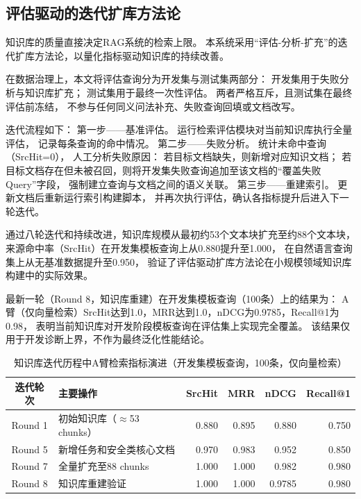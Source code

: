 \subsection{评估驱动的迭代扩库方法论}

知识库的质量直接决定RAG系统的检索上限。
本系统采用“评估-分析-扩充”的迭代扩库方法论，以量化指标驱动知识库的持续改善。

在数据治理上，本文将评估查询分为开发集与测试集两部分：
开发集用于失败分析与知识库扩充；
测试集用于最终一次性评估。
两者严格互斥，且测试集在最终评估前冻结，
不参与任何同义问法补充、失败查询回填或文档改写。

迭代流程如下：
第一步——基准评估。
运行检索评估模块对当前知识库执行全量评估，
记录每条查询的命中情况。
第二步——失败分析。
统计未命中查询（SrcHit=0），
人工分析失败原因：
若目标文档缺失，则新增对应知识文档；
若目标文档存在但未被召回，则将开发集失败查询追加至该文档的“覆盖失败Query”字段，
强制建立查询与文档之间的语义关联。
第三步——重建索引。
更新文档后重新运行索引构建脚本，
并再次执行评估，确认各指标提升后进入下一轮迭代。

通过八轮迭代和持续改进，知识库规模从最初约53个文本块扩充至约88个文本块，
来源命中率（SrcHit）在开发集模板查询上从0.880提升至1.000，
在自然语言查询集上从无基准数据提升至0.950，
验证了评估驱动扩库方法论在小规模领域知识库构建中的实际效果。

最新一轮（Round 8，知识库重建）在开发集模板查询（100条）上的结果为：
A臂（仅向量检索）SrcHit达到1.0，MRR达到1.0，nDCG为0.9785，Recall@1为0.98，
表明当前知识库对开发阶段模板查询在评估集上实现完全覆盖。
该结果仅用于开发诊断上界，不作为最终泛化性能结论。

\begin{table}[htbp]
\centering
\caption{知识库迭代历程中A臂检索指标演进（开发集模板查询，100条，仅向量检索）}
\label{tab:iter-rounds}
\begin{tabular}{clrrrr}
\toprule
迭代轮次 & 主要操作 & SrcHit & MRR & nDCG & Recall@1 \\
\midrule
Round 1 & 初始知识库（$\approx$53 chunks） & 0.880 & 0.895 & 0.880 & 0.750 \\
Round 5 & 新增任务和安全类核心文档 & 0.970 & 0.983 & 0.952 & 0.850 \\
Round 7 & 全量扩充至88 chunks & 1.000 & 1.000 & 0.982 & 0.980 \\
Round 8 & 知识库重建验证 & 1.000 & 1.000 & 0.9785 & 0.980 \\
\bottomrule
\end{tabular}
\end{table}

